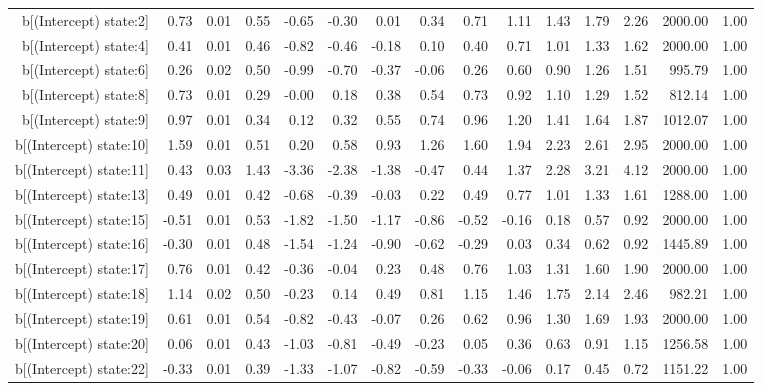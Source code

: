 \begin{table}[ht]
\begin{tabular}{rrrrrrrrrrrrrrr}
  b[(Intercept) state:2] & 0.73 & 0.01 & 0.55 & -0.65 & -0.30 & 0.01 & 0.34 & 0.71 & 1.11 & 1.43 & 1.79 & 2.26 & 2000.00 & 1.00 \\ 
  b[(Intercept) state:4] & 0.41 & 0.01 & 0.46 & -0.82 & -0.46 & -0.18 & 0.10 & 0.40 & 0.71 & 1.01 & 1.33 & 1.62 & 2000.00 & 1.00 \\ 
  b[(Intercept) state:6] & 0.26 & 0.02 & 0.50 & -0.99 & -0.70 & -0.37 & -0.06 & 0.26 & 0.60 & 0.90 & 1.26 & 1.51 & 995.79 & 1.00 \\ 
  b[(Intercept) state:8] & 0.73 & 0.01 & 0.29 & -0.00 & 0.18 & 0.38 & 0.54 & 0.73 & 0.92 & 1.10 & 1.29 & 1.52 & 812.14 & 1.00 \\ 
  b[(Intercept) state:9] & 0.97 & 0.01 & 0.34 & 0.12 & 0.32 & 0.55 & 0.74 & 0.96 & 1.20 & 1.41 & 1.64 & 1.87 & 1012.07 & 1.00 \\ 
  b[(Intercept) state:10] & 1.59 & 0.01 & 0.51 & 0.20 & 0.58 & 0.93 & 1.26 & 1.60 & 1.94 & 2.23 & 2.61 & 2.95 & 2000.00 & 1.00 \\ 
  b[(Intercept) state:11] & 0.43 & 0.03 & 1.43 & -3.36 & -2.38 & -1.38 & -0.47 & 0.44 & 1.37 & 2.28 & 3.21 & 4.12 & 2000.00 & 1.00 \\ 
  b[(Intercept) state:13] & 0.49 & 0.01 & 0.42 & -0.68 & -0.39 & -0.03 & 0.22 & 0.49 & 0.77 & 1.01 & 1.33 & 1.61 & 1288.00 & 1.00 \\ 
  b[(Intercept) state:15] & -0.51 & 0.01 & 0.53 & -1.82 & -1.50 & -1.17 & -0.86 & -0.52 & -0.16 & 0.18 & 0.57 & 0.92 & 2000.00 & 1.00 \\ 
  b[(Intercept) state:16] & -0.30 & 0.01 & 0.48 & -1.54 & -1.24 & -0.90 & -0.62 & -0.29 & 0.03 & 0.34 & 0.62 & 0.92 & 1445.89 & 1.00 \\ 
  b[(Intercept) state:17] & 0.76 & 0.01 & 0.42 & -0.36 & -0.04 & 0.23 & 0.48 & 0.76 & 1.03 & 1.31 & 1.60 & 1.90 & 2000.00 & 1.00 \\ 
  b[(Intercept) state:18] & 1.14 & 0.02 & 0.50 & -0.23 & 0.14 & 0.49 & 0.81 & 1.15 & 1.46 & 1.75 & 2.14 & 2.46 & 982.21 & 1.00 \\ 
  b[(Intercept) state:19] & 0.61 & 0.01 & 0.54 & -0.82 & -0.43 & -0.07 & 0.26 & 0.62 & 0.96 & 1.30 & 1.69 & 1.93 & 2000.00 & 1.00 \\ 
  b[(Intercept) state:20] & 0.06 & 0.01 & 0.43 & -1.03 & -0.81 & -0.49 & -0.23 & 0.05 & 0.36 & 0.63 & 0.91 & 1.15 & 1256.58 & 1.00 \\ 
  b[(Intercept) state:22] & -0.33 & 0.01 & 0.39 & -1.33 & -1.07 & -0.82 & -0.59 & -0.33 & -0.06 & 0.17 & 0.45 & 0.72 & 1151.22 & 1.00 \\ 

\end{tabular}
\end{table}
